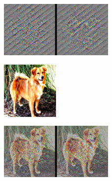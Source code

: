 \begin{figure}[H]
    \begin{small}
        \begin{center}
            \includegraphics[width=0.5\textwidth]{Figs/sin_filters_epochs_50.pdf}
        \end{center}
        \caption{}
        \label{fig:sin_filters}
    \end{small}
\end{figure}

\begin{figure}[H]
    \begin{small}
        \begin{center}
            \includegraphics[width=0.25\textwidth]{Figs/perr2_init_img_epochs_50.pdf}
        \end{center}
        \caption{}
        \label{fig:perro_init}
    \end{small}
\end{figure}


\begin{figure}[H]
    \begin{small}
        \begin{center}
            \includegraphics[width=0.5\textwidth]{Figs/perr2_filters_epochs_50.pdf}
        \end{center}
        \caption{}
        \label{fig:perro_filters}
    \end{small}
\end{figure}





